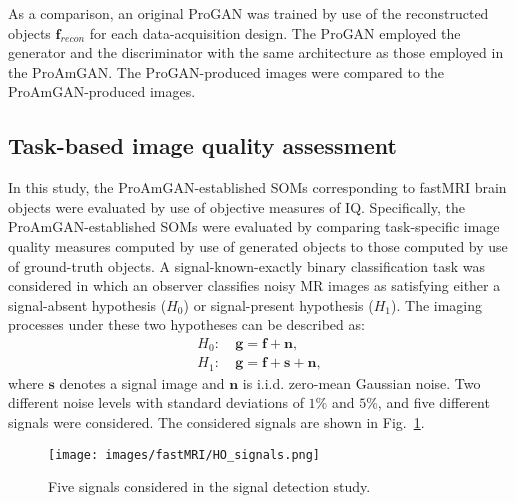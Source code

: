 \documentclass[journal]{IEEEtran}
\renewcommand{\vec}[1]{\mathbf{#1}}
\begin{document}
As a comparison, an original ProGAN was trained by use of the reconstructed objects $\vec{f}_{recon}$ for each data-acquisition design.
 The ProGAN employed the generator and the discriminator with the same architecture as those employed in the ProAmGAN.
The ProGAN-produced images were compared to the ProAmGAN-produced images.


\subsection{Task-based image quality assessment} 
In this study, the ProAmGAN-established SOMs corresponding to fastMRI brain objects were evaluated 
by use of objective measures of IQ.
Specifically, the ProAmGAN-established SOMs were evaluated 
by comparing task-specific image quality measures computed by use of generated objects to those computed by use of ground-truth objects.
A signal-known-exactly binary classification task was considered in which
an observer classifies noisy MR images as satisfying either a signal-absent hypothesis ($H_0$) or signal-present hypothesis ($H_1$).
The imaging processes under these two hypotheses can be described as:
\begin{subequations}
\label{eq:imgH_s}
\begin{align}
H_{0}:&\ \mathbf{g} = \mathbf{f} + \mathbf{n}, \\
H_{1}:&\  \mathbf{g} = \mathbf{f} + \mathbf{s} + \mathbf{n},
\end{align}
\end{subequations}
where $\mathbf{s}$ denotes a signal image and $\vec{n}$ is i.i.d. zero-mean Gaussian noise.
 Two different noise levels with standard deviations of $1\%$ and $5\%$, and five different signals  were considered. The considered signals are shown
 in Fig.~\ref{fig:signal}.

\vspace{-0.3cm}
\begin{figure}[H]
	\centering
	\texttt{[image: images/fastMRI/HO\_signals.png]}
	\caption{Five signals considered in the signal detection study.}
 \label{fig:signal}
\vspace{-0.15cm}
\end{figure}
\end{document}
